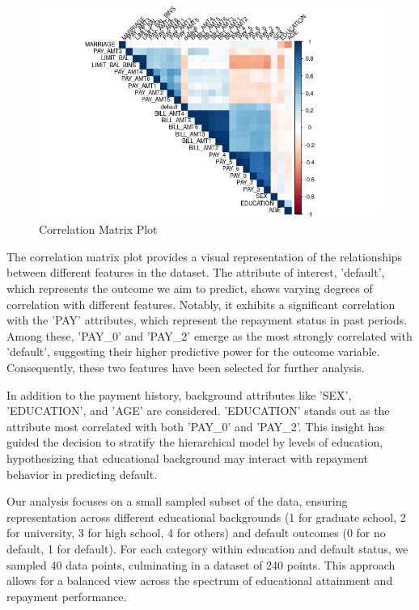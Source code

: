 \documentclass[a4paper]{artikel3}
\begin{document}
\begin{figure}
    \centering
    \includegraphics[width=1\linewidth]{correl_matrix.png}
    \caption{Correlation Matrix Plot}
    \label{fig:correl_matrix}
\end{figure}

The correlation matrix plot provides a visual representation of the relationships between different features in the dataset. The attribute of interest, 'default', which represents the outcome we aim to predict, shows varying degrees of correlation with different features. Notably, it exhibits a significant correlation with the 'PAY' attributes, which represent the repayment status in past periods. Among these, 'PAY\_0' and 'PAY\_2' emerge as the most strongly correlated with 'default', suggesting their higher predictive power for the outcome variable. Consequently, these two features have been selected for further analysis.

In addition to the payment history, background attributes like 'SEX', 'EDUCATION', and 'AGE' are considered. 'EDUCATION' stands out as the attribute most correlated with both 'PAY\_0' and 'PAY\_2'. This insight has guided the decision to stratify the hierarchical model by levels of education, hypothesizing that educational background may interact with repayment behavior in predicting default.

Our analysis focuses on a small sampled subset of the data, ensuring representation across different educational backgrounds (1 for graduate school, 2 for university, 3 for high school, 4 for others) and default outcomes (0 for no default, 1 for default). For each category within education and default status, we sampled 40 data points, culminating in a dataset of 240 points. This approach allows for a balanced view across the spectrum of educational attainment and repayment performance.
\end{document}
